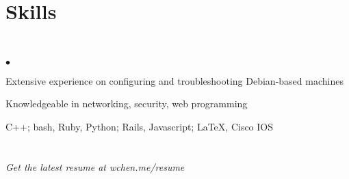 \documentclass[margin,line]{res}
\newenvironment{list2}
  {\vspace{-4mm}
   \begin{list}{$\bullet$}{
     \setlength{\itemsep}{0in}
     \setlength{\parsep}{0in} \setlength{\parskip}{0in}
     \setlength{\topsep}{0in} \setlength{\partopsep}{0in}
     \setlength{\leftmargin}{0.18in}}}
  {\end{list}}
\begin{document}
\begin{resume}
%
%
\section{\sc Skills} 
\textcolor{white}{.}
\begin{list2}
\item Extensive experience on configuring and troubleshooting Debian-based machines
\item Knowledgeable in networking, security, web programming
\item C++; bash, Ruby, Python; Rails, Javascript; \LaTeX, Cisco IOS
\end{list2}

%
%
\section{}
\textit{Get the latest resume at wchen.me/resume}


%
%




\end{resume}
\end{document}
